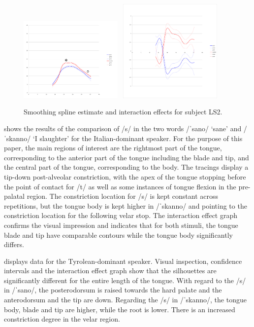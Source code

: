 \documentclass[output=paper]{LSP/langsci}
\begin{document}
\begin{figure}[p]
\includegraphics[width=0.45\textwidth]{illustrations/sprea_fig2a}~
\includegraphics[width=0.45\textwidth,trim=4 68 4 32,clip]{illustrations/sprea_fig2b}
\caption{Smoothing spline estimate and interaction effects for subject LS2.}
\label{fig:2}  
\end{figure}

 shows the results of the comparison of /s/ in the two words /ˈsano/ `sane' and /ˈskanno/ `I slaughter' for the Italian-dominant speaker. For the purpose of this paper, the main regions of interest are the rightmost part of the tongue, corresponding to the anterior part of the tongue including the blade and tip, and the central part of the tongue, corresponding to the body. The tracings display a tip-down post-alveolar constriction, with the apex of the tongue stopping before the point of contact for /t/ as well as some instances of tongue flexion in the pre-palatal region. The constriction location for /s/ is kept constant across repetitions, but the tongue body is kept higher in /ˈskanno/ and pointing to the constriction location for the following velar stop. The interaction effect graph confirms the visual impression and indicates that for both stimuli, the tongue blade and tip have comparable contours while the tongue body significantly differs.


 displays data for the Tyrolean-dominant speaker. Visual inspection, confidence intervals and the interaction effect graph show that the silhouettes are significantly different for the entire length of the tongue. With regard to the /s/ in /ˈsano/, the posterodorsum is raised towards the hard palate and the anterodorsum and the tip are down. Regarding the /s/ in /ˈskanno/, the tongue body, blade and tip are higher, while the root is lower. There is an increased constriction degree in the velar region.
\end{document}
